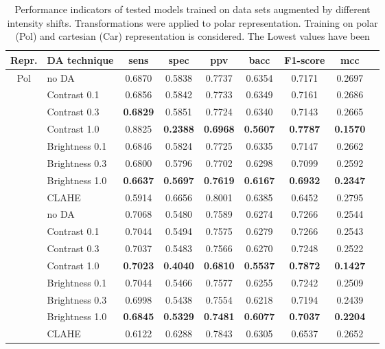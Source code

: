 \begin{table}[H]
    \centering
    \begin{tabular}{|c|l|c|c|c|c|c|c|c|}
        \hline
        Repr. & DA technique & \acrshort{sens} & \acrshort{spec} & \acrshort{ppv} & \acrshort{bacc} & F1-score & \acrshort{mcc} \\\hline\hline
        \multirow{10}{2em}{Pol} & no DA & 0.6870 & 0.5838 & 0.7737 & 0.6354 & 0.7171 & 0.2697 \\
         & Contrast 0.1 & 0.6856 & 0.5842 & 0.7733 & 0.6349 & 0.7161 & 0.2686 \\ %
         & Contrast 0.3 & \textbf{0.6829} & 0.5851 & 0.7724 & 0.6340 & 0.7143 & 0.2665 \\ %
         & Contrast 1.0 & 0.8825 & \textbf{0.2388} & \textbf{0.6968} & \textbf{0.5607} & \textbf{0.7787} & \textbf{0.1570} \\ %
         & Brightness 0.1 & 0.6846 & 0.5824 & 0.7725 & 0.6335 & 0.7147 & 0.2662 \\ %
         & Brightness 0.3 & 0.6800 & 0.5796 & 0.7702 & 0.6298 & 0.7099 & 0.2592 \\ %
         & Brightness 1.0 & \textbf{0.6637} & \textbf{0.5697} & \textbf{0.7619} & \textbf{0.6167} & \textbf{0.6932} & \textbf{0.2347} \\ %
         & CLAHE & 0.5914 & 0.6656 & 0.8001 & 0.6385 & 0.6452 & 0.2795 \\ %
        \hline
        \multirow{10}{2em}{Car} & no DA & 0.7068 & 0.5480 & 0.7589 & 0.6274 & 0.7266 & 0.2544 \\
         & Contrast 0.1 & 0.7044 & 0.5494 & 0.7575 & 0.6279 & 0.7266 & 0.2543 \\ %
         & Contrast 0.3 & 0.7037 & 0.5483 & 0.7566 & 0.6270 & 0.7248 & 0.2522 \\ %
         & Contrast 1.0 & \textbf{0.7023} & \textbf{0.4040} & \textbf{0.6810} & \textbf{0.5537} & \textbf{0.7872} & \textbf{0.1427} \\ %
         & Brightness 0.1 & 0.7044 & 0.5466 & 0.7577 & 0.6255 & 0.7242 & 0.2509 \\ %
         & Brightness 0.3 & 0.6998 & 0.5438 & 0.7554 & 0.6218 & 0.7194 & 0.2439 \\ %
         & Brightness 1.0 & \textbf{0.6845} & \textbf{0.5329} & \textbf{0.7481} & \textbf{0.6077} & \textbf{0.7037} & \textbf{0.2204} \\ %
         & CLAHE & 0.6122 & 0.6288 & 0.7843 & 0.6305 & 0.6537 & 0.2652 \\ %
        \hline
    \end{tabular}
    \caption[Intensity shiftings]{Performance indicators of tested models trained on data sets augmented by different intensity shifts. Transformations were applied to polar representation. Training on polar (Pol) and cartesian (Car) representation is considered. The Lowest values have been }
    \label{tab:intshift}
\end{table}
